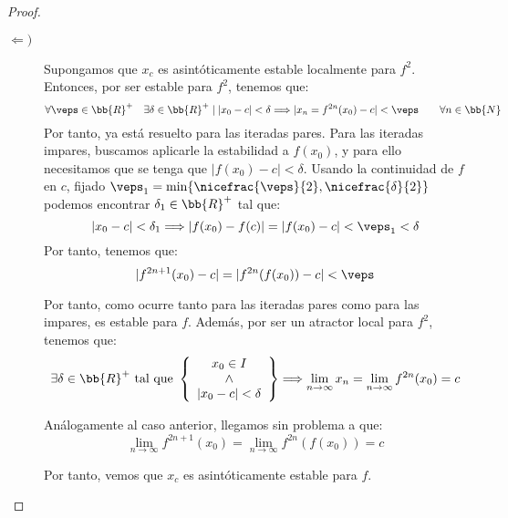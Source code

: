 \begin{proof}
\begin{description}
        \item[$\Longleftarrow)$] Supongamos que $x_c$ es asintóticamente estable localmente para $f^2$. Entonces, por ser estable para $f^2$, tenemos que:
        \begin{equation*}
            \forall \veps \in \bb{R}^+ \quad \exists \delta \in \bb{R}^+ \mid |x_0-c| < \delta \Longrightarrow |x_n=f^{2n}(x_0)-c|<\veps \qquad \forall n\in \bb{N}
        \end{equation*}
        Por tanto, ya está resuelto para las iteradas pares. Para las iteradas impares, buscamos aplicarle la estabilidad a $f(x_0)$, y para ello necesitamos que se tenga que $|f(x_0)-c|<\delta$. Usando la continuidad de $f$ en $c$, fijado $\veps_1=\min\{\nicefrac{\veps}{2},\nicefrac{\delta}{2}\}$ podemos encontrar $\delta_1\in \bb{R}^+$ tal que:
        \begin{equation*}
            |x_0-c|<\delta_1 \Longrightarrow |f(x_0)-f(c)| = |f(x_0)-c|<\veps_1< \delta
        \end{equation*}
        Por tanto, tenemos que:
        \begin{equation*}
            |f^{2n+1}(x_0)-c| = |f^{2n}(f(x_0))-c| < \veps
        \end{equation*}

        Por tanto, como ocurre tanto para las iteradas pares como para las impares, es estable para $f$. Además, por ser un atractor local para $f^2$, tenemos que:
        \begin{equation*}
            \exists \delta \in \bb{R}^+ \text{ tal que } \left\{\begin{array}{c}
                x_0\in I \\ \land \\ |x_0-c| < \delta
            \end{array}\right\} \Longrightarrow \lim_{n \to \infty} x_n = \lim_{n \to \infty} f^{2n}(x_0)= c
        \end{equation*}

        Análogamente al caso anterior, llegamos sin problema a que:
        \begin{equation*}
            \lim_{n \to \infty} f^{2n+1}(x_0) = \lim_{n \to \infty} f^{2n}(f(x_0))= c
        \end{equation*}

        Por tanto, vemos que $x_c$ es asintóticamente estable para $f$.
    \end{description}
\end{proof}

